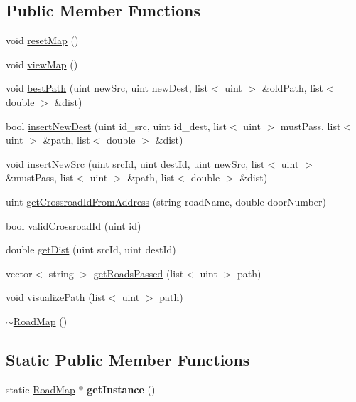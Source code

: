 \subsection*{Public Member Functions}
\begin{DoxyCompactItemize}
\item 
void \hyperlink{class_road_map_a3a2719b8e8cbbd197b94092a33376666}{reset\+Map} ()
\item 
void \hyperlink{class_road_map_a8783164e6e3f029e2ca1bac4ee620db5}{view\+Map} ()
\item 
void \hyperlink{class_road_map_a51dda1085cb948aef5593530223aa202}{best\+Path} (uint new\+Src, uint new\+Dest, list$<$ uint $>$ \&old\+Path, list$<$ double $>$ \&dist)
\item 
bool \hyperlink{class_road_map_a6e25c8aefc49316e95c3eb3111d06151}{insert\+New\+Dest} (uint id\+\_\+src, uint id\+\_\+dest, list$<$ uint $>$ must\+Pass, list$<$ uint $>$ \&path, list$<$ double $>$ \&dist)
\item 
void \hyperlink{class_road_map_a00a0a45209179dae49cebd1c50908dd6}{insert\+New\+Src} (uint src\+Id, uint dest\+Id, uint new\+Src, list$<$ uint $>$ \&must\+Pass, list$<$ uint $>$ \&path, list$<$ double $>$ \&dist)
\item 
uint \hyperlink{class_road_map_aca51fa3ea3ae51d9790f186092fe9a29}{get\+Crossroad\+Id\+From\+Address} (string road\+Name, double door\+Number)
\item 
bool \hyperlink{class_road_map_aa1e10da727052cf0ca8c4a050e1c684b}{valid\+Crossroad\+Id} (uint id)
\item 
double \hyperlink{class_road_map_a9970c4e809908d7a3784b23666ec5d10}{get\+Dist} (uint src\+Id, uint dest\+Id)
\item 
vector$<$ string $>$ \hyperlink{class_road_map_acecd13293d634caa11afba05ec496233}{get\+Roads\+Passed} (list$<$ uint $>$ path)
\item 
void \hyperlink{class_road_map_a700ada8d9925f1322804e0d08a007ff1}{visualize\+Path} (list$<$ uint $>$ path)
\item 
\hyperlink{class_road_map_a4945159808914eb623e1abb3b9b63306}{$\sim$\+Road\+Map} ()
\end{DoxyCompactItemize}
\subsection*{Static Public Member Functions}
\begin{DoxyCompactItemize}
\item 
static \hyperlink{class_road_map}{Road\+Map} $\ast$ {\bfseries get\+Instance} ()\hypertarget{class_road_map_ad106d7b921a092b9375682a5ec475fae}{}\label{class_road_map_ad106d7b921a092b9375682a5ec475fae}

\end{DoxyCompactItemize}
